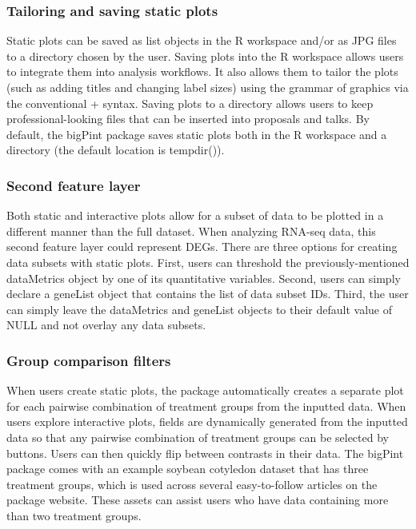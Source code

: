 \documentclass[parskip=full]{bmcart}
\begin{document}
\subsubsection*{Tailoring and saving static plots}

Static plots can be saved as list objects in the R workspace and/or as JPG files to a directory chosen by the user. Saving plots into the R workspace allows users to integrate them into analysis workflows. It also allows them to tailor the plots (such as adding titles and changing label sizes) using the grammar of graphics via the conventional + syntax. Saving plots to a directory allows users to keep professional-looking files that can be inserted into proposals and talks. By default, the bigPint package saves static plots both in the R workspace and a directory (the default location is tempdir()).

\subsubsection*{Second feature layer}

Both static and interactive plots allow for a subset of data to be plotted in a different manner than the full dataset. When analyzing RNA-seq data, this second feature layer could represent DEGs. There are three options for creating data subsets with static plots. First, users can threshold the previously-mentioned dataMetrics object by one of its quantitative variables. Second, users can simply declare a geneList object that contains the list of data subset IDs. Third, the user can simply leave the dataMetrics and geneList objects to their default value of NULL and not overlay any data subsets.

\subsubsection*{Group comparison filters}

When users create static plots, the package automatically creates a separate plot for each pairwise combination of treatment groups from the inputted data. When users explore interactive plots, fields are dynamically generated from the inputted data so that any pairwise combination of treatment groups can be selected by buttons. Users can then quickly flip between contrasts in their data. The bigPint package comes with an example soybean cotyledon dataset that has three treatment groups, which is used across several easy-to-follow articles on the package website. These assets can assist users who have data containing more than two treatment groups. 
\end{document}
